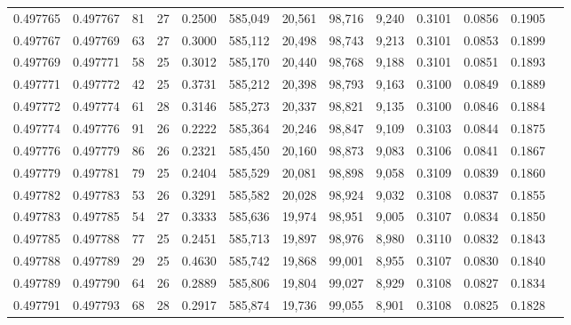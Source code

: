 \begin{tabular}{rrrrrrrrrrrrr}
0.497765 & 0.497767 &  81 &  27 &                                     0.2500 & 585,049 &  20,561 &  98,716 &   9,240 & 0.3101 & 0.0856 & 0.1905 \\
0.497767 & 0.497769 &  63 &  27 &                                     0.3000 & 585,112 &  20,498 &  98,743 &   9,213 & 0.3101 & 0.0853 & 0.1899 \\
0.497769 & 0.497771 &  58 &  25 &                                     0.3012 & 585,170 &  20,440 &  98,768 &   9,188 & 0.3101 & 0.0851 & 0.1893 \\
0.497771 & 0.497772 &  42 &  25 &                                     0.3731 & 585,212 &  20,398 &  98,793 &   9,163 & 0.3100 & 0.0849 & 0.1889 \\
0.497772 & 0.497774 &  61 &  28 &                                     0.3146 & 585,273 &  20,337 &  98,821 &   9,135 & 0.3100 & 0.0846 & 0.1884 \\
0.497774 & 0.497776 &  91 &  26 &                                     0.2222 & 585,364 &  20,246 &  98,847 &   9,109 & 0.3103 & 0.0844 & 0.1875 \\
0.497776 & 0.497779 &  86 &  26 &                                     0.2321 & 585,450 &  20,160 &  98,873 &   9,083 & 0.3106 & 0.0841 & 0.1867 \\
0.497779 & 0.497781 &  79 &  25 &                                     0.2404 & 585,529 &  20,081 &  98,898 &   9,058 & 0.3109 & 0.0839 & 0.1860 \\
0.497782 & 0.497783 &  53 &  26 &                                     0.3291 & 585,582 &  20,028 &  98,924 &   9,032 & 0.3108 & 0.0837 & 0.1855 \\
0.497783 & 0.497785 &  54 &  27 &                                     0.3333 & 585,636 &  19,974 &  98,951 &   9,005 & 0.3107 & 0.0834 & 0.1850 \\
0.497785 & 0.497788 &  77 &  25 &                                     0.2451 & 585,713 &  19,897 &  98,976 &   8,980 & 0.3110 & 0.0832 & 0.1843 \\
0.497788 & 0.497789 &  29 &  25 &                                     0.4630 & 585,742 &  19,868 &  99,001 &   8,955 & 0.3107 & 0.0830 & 0.1840 \\
0.497789 & 0.497790 &  64 &  26 &                                     0.2889 & 585,806 &  19,804 &  99,027 &   8,929 & 0.3108 & 0.0827 & 0.1834 \\
0.497791 & 0.497793 &  68 &  28 &                                     0.2917 & 585,874 &  19,736 &  99,055 &   8,901 & 0.3108 & 0.0825 & 0.1828 \\

\end{tabular}
